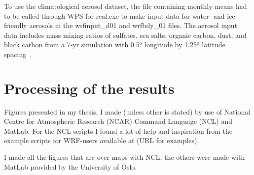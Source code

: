 To use the climatological aerosol dataset, the file containing monthly means had to be called through WPS for real.exe to make input data for water- and ice-friendly aerosols in the wrfinput\_d01 and wrfbdy\_01 files. The aerosol input data includes mass mixing ratios of sulfates, sea salts, organic carbon, dust, and black carbon from a 7-yr simulation with 0.5$^{\text{o}}$ longitude by 1.25$^{\text{o}}$ latitude spacing~\citep{Thompson2014}.

\section{Processing of the results}
Figures presented in my thesis, I made (unless other is stated) by use of National Centre for Atmospheric Research (NCAR) Command Language (NCL) and MatLab. For the NCL scripts I found a lot of help and inspiration from the example scripts for WRF-users available at (URL for examples).

I made all the figures that are over maps with NCL, the others were made with MatLab provided by the University of Oslo.


